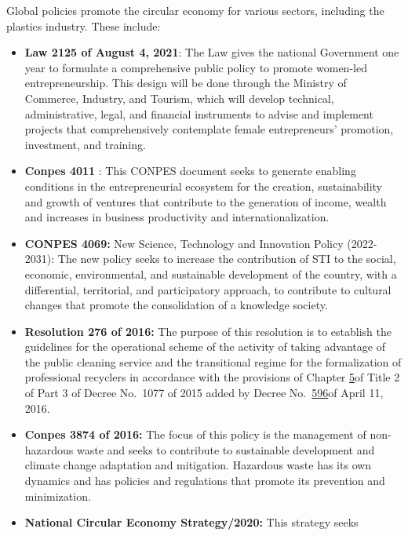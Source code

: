 \documentclass[
  12pt,
  oneside]{book}
\providecommand{\tightlist}{%
  \setlength{\itemsep}{0pt}\setlength{\parskip}{0pt}}
\begin{document}
Global policies promote the circular economy for various sectors,
including the plastics industry. These include:

\begin{itemize}
\tightlist
\item
  \textbf{Law 2125 of August 4, 2021}: The Law gives the national
  Government one year to formulate a comprehensive public policy to
  promote women-led entrepreneurship. This design will be done through
  the Ministry of Commerce, Industry, and Tourism, which will develop
  technical, administrative, legal, and financial instruments to advise
  and implement projects that comprehensively contemplate female
  entrepreneurs' promotion, investment, and training.
\item
  \textbf{Conpes 4011 }: This CONPES document seeks to generate enabling
  conditions in the entrepreneurial ecosystem for the creation,
  sustainability and growth of ventures that contribute to the
  generation of income, wealth and increases in business productivity
  and internationalization.
\item
  \textbf{CONPES 4069: }New Science, Technology and Innovation Policy
  (2022-2031): The new policy seeks to increase the contribution of STI
  to the social, economic, environmental, and sustainable development of
  the country, with a differential, territorial, and participatory
  approach, to contribute to cultural changes that promote the
  consolidation of a knowledge society.
\item
  \textbf{Resolution 276 of 2016: }The purpose of this resolution is to
  establish the guidelines for the operational scheme of the activity of
  taking advantage of the public cleaning service and the transitional
  regime for the formalization of professional recyclers in accordance
  with the provisions of Chapter
  \href{https://normas.cra.gov.co/gestor/docs/decreto_1077_2015.htm\#CAP\%C3\%8DTULO\%202.3.2.5}{5}of
  Title 2 of Part 3 of Decree No.~1077 of 2015 added by Decree
  No.~\href{https://normas.cra.gov.co/gestor/docs/decreto_0596_2016.htm\#INICIO}{596}of
  April 11, 2016.
\item
  \textbf{Conpes 3874 of 2016: }The focus of this policy is the
  management of non-hazardous waste and seeks to contribute to
  sustainable development and climate change adaptation and mitigation.
  Hazardous waste has its own dynamics and has policies and regulations
  that promote its prevention and minimization.
\item
  \textbf{National Circular Economy Strategy/2020: }This strategy seeks

\end{itemize}
\end{document}
